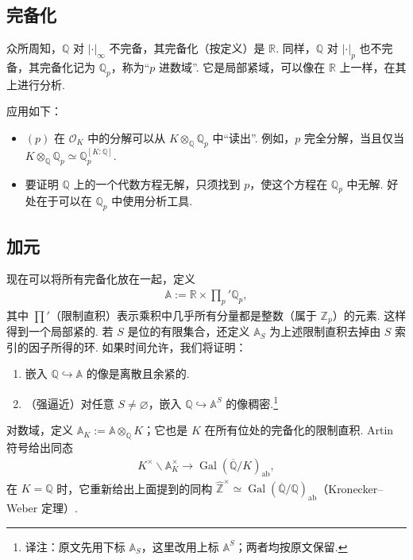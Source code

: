 \subsection{完备化}\label{sec:nt-1-3-2}

众所周知，$\mathbb{Q}$ 对 $|\cdot|_\infty$ 不完备，其完备化（按定义）是 $\mathbb{R}$. 同样，$\mathbb{Q}$ 对 $|\cdot|_p$ 也不完备，其完备化记为 $\mathbb{Q}_p$，称为``$p$ 进数域''. 它是局部紧域，可以像在 $\mathbb{R}$ 上一样，在其上进行分析.

应用如下：

\begin{itemize}

\item $(p)$ 在 $\mathcal O_K$ 中的分解可以从 $K\otimes_\mathbb{Q}\mathbb{Q}_p$ 中``读出''. 例如，$p$ 完全分解，当且仅当 $K\otimes_\mathbb{Q}\mathbb{Q}_p\simeq\mathbb{Q}_p^{[K:\mathbb{Q}]}$.

\item 要证明 $\mathbb{Q}$ 上的一个代数方程无解，只须找到 $p$，使这个方程在 $\mathbb{Q}_p$ 中无解. 好处在于可以在 $\mathbb{Q}_p$ 中使用分析工具.

\end{itemize}

\subsection{加元}\label{sec:nt-1-3-3}

现在可以将所有完备化放在一起，定义
\begin{align*}
\mathbb A:=\mathbb{R}\times\prod_p'\mathbb{Q}_p,
\end{align*}
其中 $\prod'$（限制直积）表示乘积中几乎所有分量都是整数（属于 $\mathbb{Z}_p$）的元素. 这样得到一个局部紧的. 若 $S$ 是位的有限集合，还定义 $\mathbb A_S$ 为上述限制直积去掉由 $S$ 索引的因子所得的环. 如果时间允许，我们将证明：

\begin{proposition*}

\begin{enumerate}[label=\roman*)]

\item 嵌入 $\mathbb{Q}\hookrightarrow\mathbb A$ 的像是离散且余紧的.

\item （强逼近）对任意 $S\ne\varnothing$，嵌入 $\mathbb{Q}\hookrightarrow\mathbb A^S$ 的像稠密.\footnote{译注：原文先用下标 $\mathbb A_S$，这里改用上标 $\mathbb A^S$；两者均按原文保留.}

\end{enumerate}

\end{proposition*}

对数域，定义 $\mathbb A_K:=\mathbb A\otimes_\mathbb{Q}K$；它也是 $K$ 在所有位处的完备化的限制直积. Artin 符号给出同态
\begin{align*}
K^\times\backslash\mathbb A_K^\times\longrightarrow\operatorname{Gal}(\overline{\mathbb{Q}}/K)_{\mathrm{ab}},
\end{align*}
在 $K=\mathbb{Q}$ 时，它重新给出上面提到的同构 $\widehat{\mathbb{Z}}^\times\simeq\operatorname{Gal}(\overline{\mathbb{Q}}/\mathbb{Q})_{\mathrm{ab}}$（Kronecker--Weber 定理）.

